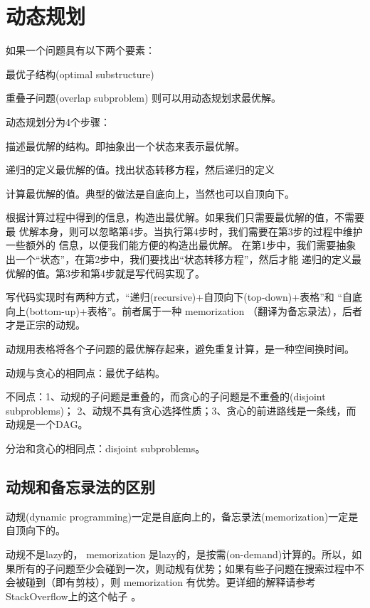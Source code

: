 \chapter{动态规划}


如果一个问题具有以下两个要素：
\begindot
\item 最优子结构(optimal substructure)
\item 重叠子问题(overlap subproblem)
\myenddot
则可以用动态规划求最优解。

动态规划分为4个步骤：
\begindot
\item 描述最优解的结构。即抽象出一个状态来表示最优解。
\item 递归的定义最优解的值。找出状态转移方程，然后递归的定义
\item 计算最优解的值。典型的做法是自底向上，当然也可以自顶向下。
\item 根据计算过程中得到的信息，构造出最优解。如果我们只需要最优解的值，不需要最
优解本身，则可以忽略第4步。当执行第4步时，我们需要在第3步的过程中维护一些额外的
信息，以便我们能方便的构造出最优解。
\myenddot
在第1步中，我们需要抽象出一个“状态”，在第2步中，我们要找出“状态转移方程”，然后才能
递归的定义最优解的值。第3步和第4步就是写代码实现了。

写代码实现时有两种方式，“递归(recursive)+自顶向下(top-down)+表格”和
“自底向上(bottom-up)+表格”。前者属于一种 memorization （翻译为备忘录法），后者才是正宗的动规。

动规用表格将各个子问题的最优解存起来，避免重复计算，是一种空间换时间。

动规与贪心的相同点：最优子结构。

不同点：1、动规的子问题是重叠的，而贪心的子问题是不重叠的(disjoint subproblems)；
2、动规不具有贪心选择性质；3、贪心的前进路线是一条线，而动规是一个DAG。

分治和贪心的相同点：disjoint subproblems。


\section{动规和备忘录法的区别} %
\label{sec:dp-vs-memorization}

动规(dynamic programming)一定是自底向上的，备忘录法(memorization)一定是自顶向下的。

动规不是lazy的， memorization 是lazy的，是按需(on-demand)计算的。所以，如果所有的子问题至少会碰到一次，则动规有优势；如果有些子问题在搜索过程中不会被碰到（即有剪枝），则 memorization 有优势。更详细的解释请参考StackOverflow上的这个帖子  。

